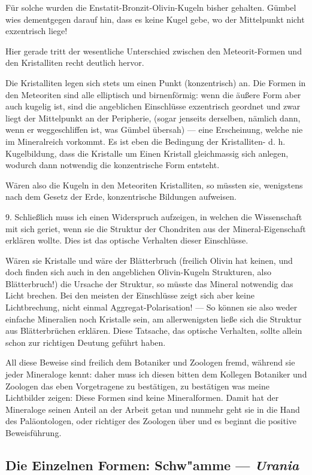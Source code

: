 \documentclass[a4paper, 12pt, oneside]{article}
\begin{document}
Für solche wurden die Enstatit-Bronzit-Olivin-Kugeln bisher gehalten. Gümbel wies dementgegen darauf hin, dass es keine Kugel gebe, wo der Mittelpunkt nicht exzentrisch liege!

Hier gerade tritt der wesentliche Unterschied zwischen den Meteorit-Formen und den Kristalliten recht deutlich hervor.

Die Kristalliten legen sich stets um einen Punkt (konzentrisch) an. Die Formen in den Meteoriten sind alle elliptisch und birnenförmig: wenn die äußere Form aber auch kugelig ist, sind die angeblichen Einschlüsse exzentrisch geordnet und zwar liegt der Mittelpunkt an der Peripherie, (sogar jenseits derselben, nämlich dann, wenn er weggeschliffen ist, was Gümbel übersah) — eine Erscheinung, welche nie im Mineralreich vorkommt. Es ist eben die Bedingung der Kristalliten- d. h. Kugelbildung, dass die Kristalle um Einen Kristall gleichmassig sich anlegen, wodurch dann notwendig die konzentrische Form entsteht.

Wären also die Kugeln in den Meteoriten Kristalliten, so müssten sie, wenigstens nach dem Gesetz der Erde, konzentrische Bildungen aufweisen.

9. Schließlich muss ich einen Widerspruch aufzeigen, in welchen die Wissenschaft mit sich geriet, wenn sie die Struktur der Chondriten aus der Mineral-Eigenschaft erklären wollte. Dies ist das optische Verhalten dieser Einschlüsse.

Wären sie Kristalle und wäre der Blätterbruch (freilich Olivin hat keinen, und doch finden sich auch in den angeblichen Olivin-Kugeln Strukturen, also Blätterbruch!) die Ursache der Struktur, so müsste das Mineral notwendig das Licht brechen. Bei den meisten der Einschlüsse zeigt sich aber keine Lichtbrechung, nicht einmal Aggregat-Polarisation! — So können sie also weder einfache Mineralien noch Kristalle sein, am allerwenigsten ließe sich die Struktur aus Blätterbrüchen erklären. Diese Tatsache, das optische Verhalten, sollte allein schon zur richtigen Deutung geführt haben.

All diese Beweise sind freilich dem Botaniker und Zoologen fremd, während sie jeder Mineraloge kennt: daher muss ich diesen bitten dem Kollegen Botaniker und Zoologen das eben Vorgetragene zu bestätigen, zu bestätigen was meine Lichtbilder zeigen: Diese Formen sind keine Mineralformen. Damit hat der Mineraloge seinen Anteil an der Arbeit getan und nunmehr geht sie in die Hand des Paläontologen, oder richtiger des Zoologen über und es beginnt die positive Beweisführung.
\clearpage
\subsection{Die Einzelnen Formen: Schw"amme --- \emph{Urania}}
\end{document}
